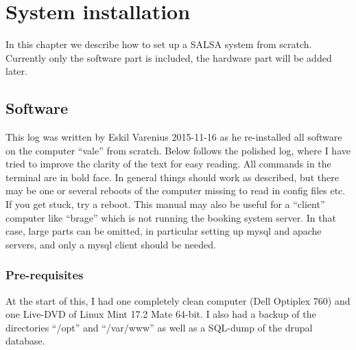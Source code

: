 \chapter{System installation}
In this chapter we describe how to set up a SALSA system from scratch. Currently only the software part is included, the hardware part will be added later.

\section{Software}
This log was written by Eskil Varenius 2015-11-16 as he re-installed all
software on the computer “vale” from scratch. Below follows the polished log,
where I have tried to improve the clarity of the text for easy reading. All
commands in the terminal are in bold face. In general things should work as
described, but there may be one or several reboots of the computer missing to
read in config files etc. If you get stuck, try a reboot. This manual may also
be useful for a “client” computer like “brage” which is not running the booking
system server. In that case, large parts can be omitted, in particular setting
up mysql and apache servers, and only a mysql client should be needed.

\subsection{Pre-requisites}
At the start of this, I had one completely clean computer (Dell Optiplex 760)
and one Live-DVD of Linux Mint 17.2 Mate 64-bit. I also had a backup of the
directories “/opt” and “/var/www” as well as a SQL-dump of the drupal database.

